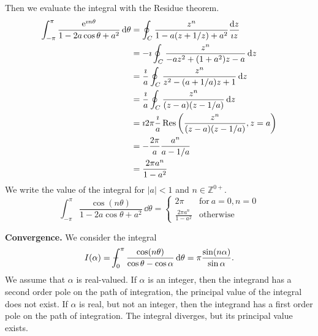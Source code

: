 {\begin{Solution}
\begin{enumerate}
    Then we evaluate the integral with the Residue theorem.
    \begin{align*}
      \int_{-\pi}^{\pi}\frac{\mathop{\mathrm{e}}\nolimits^{\imath n \theta}}{1 - 2 a \cos \theta + a^2} \,\mathrm{d} \theta
      &= \oint_C \frac{ z^n }{ 1 - a (z + 1/z) + a^2 }  \frac{\mathrm{d} z}{\imath z} \\
      &= - \imath \oint_C \frac{ z^n }{ -a z^2 + (1+a^2) z - a} \,\mathrm{d} z \\
      &= \frac{\imath}{a} \oint_C \frac{ z^n }{ z^2 - (a + 1/a) z + 1} \,\mathrm{d} z \\
      &= \frac{\imath}{a} \oint_C \frac{ z^n }{(z-a)(z-1/a)} \,\mathrm{d} z \\
      &= \imath 2 \pi \frac{\imath}{a} \mathop{\mathrm{Res}}\nolimits \left( \frac{ z^n }{(z-a)(z-1/a)},
        z = a \right) \\
      &= - \frac{2 \pi}{a} \frac{a^n}{a - 1/a} \\
      &= \frac{2 \pi a^n}{1 - a^2}
    \end{align*}
    We write the value of the integral for $|a| < 1$ and $n \in \mathbb{Z}^{0+}$.
    \[
    \boxed{
      \int_{-\pi}^{\pi}\frac{\cos(n \theta)}{1 - 2 a \cos \theta + a^2} \,\dd\theta = 
      \begin{cases}
        2 \pi &\mathrm{for}\ a = 0, n = 0 \\
        \frac{2 \pi a^n}{1 - a^2}  &\mathrm{otherwise}
      \end{cases}
      }
    \]
  \end{enumerate}
\end{Solution}










\begin{Solution}
  \label{solution cos(n t)/(cos t - cos a)}
  \textbf{Convergence.}
  We consider the integral
  \[
  I(\alpha) = - \negthickspace \negthickspace \negthickspace \negmedspace\int_0^\pi \frac{ \cos(n \theta) }{ \cos \theta - \cos \alpha }
  \,\mathrm{d} \theta = \pi \frac{ \sin(n \alpha) }{ \sin \alpha }.
  \]
  We assume that $\alpha$ is real-valued.
  If $\alpha$ is an integer, then the integrand has a second order pole 
  on the path of integration, the principal value of the integral does
  not exist.  If $\alpha$ is real, but not an integer, then the integrand
  has a first order pole on the path of integration.  The integral diverges,
  but its principal value exists.  



\end{Solution}}
